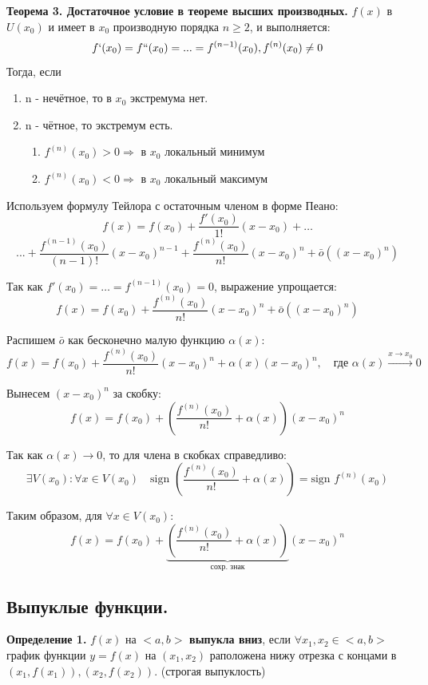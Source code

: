 \documentclass[12pt, a4paper]{article}
\newcommand{\sign}{\text{sign\ }}
\begin{document}
\textbf{Теорема 3. Достаточное условие в теореме высших производных.} 
$f(x)$ в $U(x_0)$ и имеет в $x_0$ производную порядка $n \geq 2$, и выполняется:
\[ f`(x_0) = f``(x_0) = ...  = f^{(n - 1)}(x_0), f^{(n)}(x_0) \not= 0\]
Тогда, если 
\begin{enumerate}
	\item n - нечётное, то в $x_0$ экстремума нет. 
	\item n - чётное, то экстремум есть. 
		\begin{enumerate}
			\item $f^{(n)}(x_0) > 0 \Rightarrow$ в $x_0$ локальный минимум
			\item $f^{(n)}(x_0) < 0 \Rightarrow$ в $x_0$ локальный максимум
		\end{enumerate}
\end{enumerate}
\begin{tcolorbox}[title=Доказательство Формулы Тейлора и остатком по Пиано.]
	Используем формулу Тейлора с остаточным членом в форме Пеано:
	\[ f(x) = f(x_0) + \frac{f'(x_0)}{1!}(x-x_0) + \dots\] 
	\[... + \frac{f^{(n-1)}(x_0)}{(n-1)!}(x-x_0)^{n-1} + \frac{f^{(n)}(x_0)}{n!}(x-x_0)^n + \bar{o}((x-x_0)^n) \]
	
	Так как $f'(x_0) = \dots = f^{(n-1)}(x_0) = 0$, выражение упрощается:
	\[ f(x) = f(x_0) + \frac{f^{(n)}(x_0)}{n!}(x-x_0)^n + \bar{o}((x-x_0)^n) \]
	
	Распишем $\bar{o}$ как бесконечно малую функцию $\alpha(x)$:
	\[ f(x) = f(x_0) + \frac{f^{(n)}(x_0)}{n!}(x-x_0)^n + \alpha(x)(x-x_0)^n, \quad \text{где } \alpha(x) \xrightarrow{x \to x_0} 0 \]
	
	Вынесем $(x-x_0)^n$ за скобку:
	\[ f(x) = f(x_0) + \left( \frac{f^{(n)}(x_0)}{n!} + \alpha(x) \right) (x-x_0)^n \]
	
	Так как $\alpha(x) \to 0$, то для члена в скобках справедливо:
	\[ \exists V(x_0): \forall x \in V(x_0) \quad \sign \left( \frac{f^{(n)}(x_0)}{n!} + \alpha(x) \right) = \sign f^{(n)}(x_0) \]
	
	Таким образом, для $\forall x \in V(x_0)$:
	\[ f(x) = f(x_0) + \underbrace{\left( \frac{f^{(n)}(x_0)}{n!} + \alpha(x) \right)}_{\text{сохр. знак}} (x-x_0)^n \]
	
\end{tcolorbox}

\subsection{Выпуклые функции.}
\textbf{Определение 1.} $f(x)$ на $<a, b>$ \textbf{выпукла вниз}, если $\forall x_1, x_2 \in <a, b>$ график функции $y = f(x)$ на $(x_1, x_2)$ раположена нижу отрезка с концами в $(x_1, f(x_1)), (x_2, f(x_2))$. (строгая выпуклость)
\end{document}
